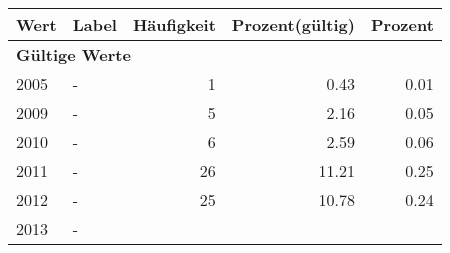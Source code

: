      \begin{longtable}{lXrrr}
     \toprule
     \textbf{Wert} & \textbf{Label} & \textbf{Häufigkeit} & \textbf{Prozent(gültig)} & \textbf{Prozent} \\
     \endhead
     \midrule
     \multicolumn{5}{l}{\textbf{Gültige Werte}}\\

     2005 &
     \multicolumn{1}{X}{ -  } &


       \num{1} &
       \num[round-mode=places,round-precision=2]{0,43} &
         \num[round-mode=places,round-precision=2]{0,01} \\

     2009 &
     \multicolumn{1}{X}{ -  } &


       \num{5} &
       \num[round-mode=places,round-precision=2]{2,16} &
         \num[round-mode=places,round-precision=2]{0,05} \\

     2010 &
     \multicolumn{1}{X}{ -  } &


       \num{6} &
       \num[round-mode=places,round-precision=2]{2,59} &
         \num[round-mode=places,round-precision=2]{0,06} \\

     2011 &
     \multicolumn{1}{X}{ -  } &


       \num{26} &
       \num[round-mode=places,round-precision=2]{11,21} &
         \num[round-mode=places,round-precision=2]{0,25} \\

     2012 &
     \multicolumn{1}{X}{ -  } &


       \num{25} &
       \num[round-mode=places,round-precision=2]{10,78} &
         \num[round-mode=places,round-precision=2]{0,24} \\

     2013 &
     \multicolumn{1}{X}{ -  } &



\end{longtable}
